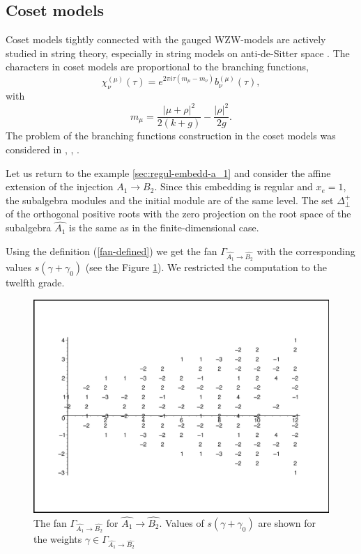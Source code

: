 \documentclass[12pt]{iopart}
\theoremstyle{definition}
\begin{document}
\subsection{Coset models}
\label{sec:coset-models}

Coset models \cite{Goddard198588} tightly connected with the gauged WZW-models are actively studied
in string theory, especially in string models on anti-de-Sitter space
\cite{Maldacena:2000hw,Maldacena:2000kv,Maldacena:2001km,Maldacena:2001ky,Aharony:1999ti}.
The characters in coset models are proportional to the branching functions,
\begin{equation}
  \label{eq:31}
  \chi^{(\mu)}_{\nu}(\tau)=e^{2\pi i \tau (m_{\mu}-m_{\nu})} b^{(\mu)}_{\nu}(\tau),
\end{equation}
with
\begin{equation*}
  \label{eq:46}
  m_{\mu}=\frac{\left|\mu+\rho\right|^2}{2(k+g)}-\frac{\left|\rho\right|^2}{2g}.
\end{equation*}
The problem of the branching functions construction in the coset models was considered
in  \cite{Dunbar:1992gh}, \cite{Hwang:1994yr}, \cite{lu1994branching}.

Let us return to the example \ref{sec:regul-embedd-a_1} and consider the affine extension of the injection
$A_1 \longrightarrow B_2$.
Since this embedding is regular and $x_e=1$, the subalgebra modules and the initial module are of the same level.
The set $\Delta^{+}_{\bot}$ of the orthogonal positive roots with the zero projection
on the root space of the subalgebra $\hat{A_1}$ is the same as in the finite-dimensional case.

Using the definition (\ref{fan-defined}) we get the fan
$\Gamma_{\hat{A_1} \longrightarrow  \hat{B_2} }$
with the corresponding values $s(\gamma+\gamma_0)$ (see the Figure \ref{fig:AffineB2A1Fan}).
We restricted the computation to the twelfth grade.
\begin{figure}[h!bt]
  \centering
  \includegraphics[width=135mm]{figure10.eps}
  \caption{The fan $\Gamma_{\hat{A_1}\longrightarrow \hat{B_2}}$ for $\hat{A_1}\longrightarrow \hat{B_2}$. Values of  $s(\gamma+\gamma_0)$ are shown for the weights $\gamma\in \Gamma_{\hat{A_1}\longrightarrow \hat{B_2}}$}
  \label{fig:AffineB2A1Fan}
\end{figure}
\end{document}

